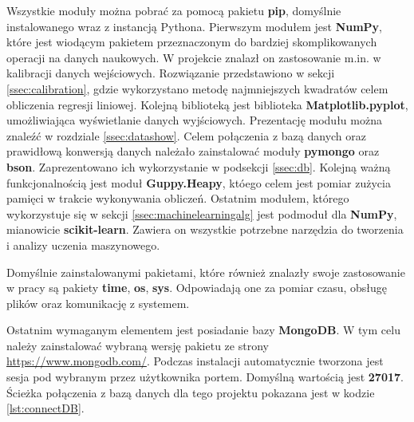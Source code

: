 Wszystkie moduły można pobrać za pomocą pakietu \textbf{pip}, domyślnie instalowanego wraz z instancją Pythona. Pierwszym modułem jest \textbf{NumPy}, które jest wiodącym pakietem przeznaczonym do bardziej skomplikowanych operacji na danych naukowych. W projekcie znalazł on zastosowanie m.in. w kalibracji danych wejściowych. Rozwiązanie przedstawiono w sekcji \ref{ssec:calibration}, gdzie wykorzystano metodę najmniejszych kwadratów celem obliczenia regresji liniowej. Kolejną biblioteką jest biblioteka \textbf{Matplotlib.pyplot}, umożliwiająca wyświetlanie danych wyjściowych. Prezentację modułu można znaleźć w rozdziale \ref{ssec:datashow}. Celem połączenia z bazą danych oraz prawidłową konwersją danych należało zainstalować moduły \textbf{pymongo} oraz \textbf{bson}. Zaprezentowano ich wykorzystanie w podsekcji \ref{ssec:db}. Kolejną ważną funkcjonalnością jest moduł \textbf{Guppy.Heapy}, któego celem jest pomiar zużycia pamięci w trakcie wykonywania obliczeń. Ostatnim modułem, którego wykorzystuje się w sekcji \ref{ssec:machinelearningalg} jest podmoduł dla \textbf{NumPy}, mianowicie \textbf{scikit-learn}. Zawiera on wszystkie potrzebne narzędzia do tworzenia i analizy uczenia maszynowego.\par
Domyślnie zainstalowanymi pakietami, które również znalazły swoje zastosowanie w pracy są pakiety \textbf{time}, \textbf{os}, \textbf{sys}. Odpowiadają one za pomiar czasu, obsługę plików oraz komunikację z systemem.\par
Ostatnim wymaganym elementem jest posiadanie bazy \textbf{MongoDB}. W tym celu należy zainstalować wybraną wersję pakietu ze strony \url{https://www.mongodb.com/}. Podczas instalacji automatycznie tworzona jest sesja pod wybranym przez użytkownika portem. Domyślną wartością jest \textbf{27017}. Ścieżka połączenia z bazą danych dla tego projektu pokazana jest w kodzie \ref{lst:connectDB}.
